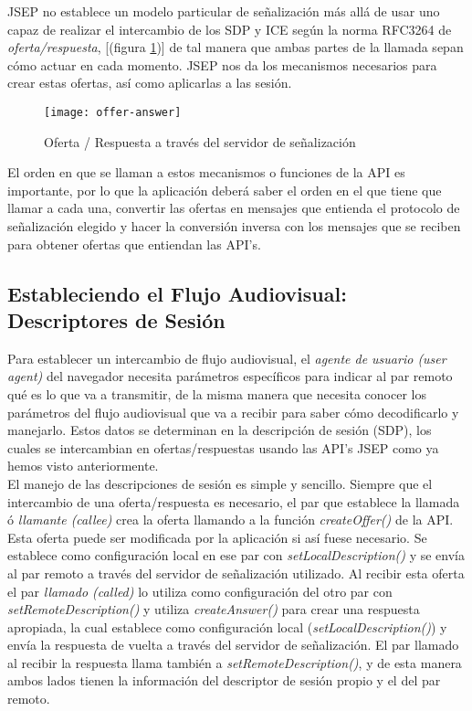 JSEP no establece un modelo particular de señalización más allá de usar uno capaz de realizar el intercambio de los SDP y ICE según la norma RFC3264 de \emph{oferta/respuesta}, [(figura \ref{fig:oferta-respuesta})] de tal manera que ambas partes de la llamada sepan cómo actuar en cada momento. JSEP nos da los mecanismos necesarios para crear estas ofertas, así como aplicarlas a las sesión.\\

\begin{figure}[h!]
\centering
\texttt{[image: offer-answer]}
\caption{Oferta / Respuesta a través del servidor de señalización}
\label{fig:oferta-respuesta}
\end{figure}


El orden en que se llaman a estos mecanismos o funciones de la API es importante, por lo que la aplicación deberá saber el orden en el que tiene que llamar a cada una, convertir las ofertas en mensajes que entienda el protocolo de señalización elegido y hacer la conversión inversa con los mensajes que se reciben para obtener ofertas que entiendan las API's.\\


\subsection{Estableciendo el Flujo Audiovisual: Descriptores de Sesión}

Para establecer un intercambio de flujo audiovisual, el \textit{agente de usuario (user agent)} del navegador necesita parámetros específicos para indicar al par remoto qué es lo que va a transmitir, de la misma manera que necesita conocer los parámetros del flujo audiovisual que va a recibir para saber cómo decodificarlo y manejarlo. Estos datos se determinan en la descripción de sesión (SDP), los cuales se intercambian en ofertas/respuestas usando las API's JSEP como ya hemos visto anteriormente.\\

El manejo de las descripciones de sesión es simple y sencillo. Siempre que el intercambio de una oferta/respuesta es necesario, el par que establece la llamada ó \textit{llamante (callee)} crea la oferta llamando a la función \emph{createOffer()} de la API. Esta oferta puede ser modificada por la aplicación si así fuese necesario. Se establece como configuración local en ese par con \emph{setLocalDescription()} y se envía al par remoto a través del servidor de señalización utilizado. Al recibir esta oferta el par \textit{llamado (called)} lo utiliza como configuración del otro par con \emph{setRemoteDescription()} y utiliza \emph{createAnswer()} para crear una respuesta apropiada, la cual establece como configuración local (\emph{setLocalDescription()}) y envía la respuesta de vuelta a través del servidor de señalización. El par llamado al recibir la respuesta llama también a \emph{setRemoteDescription()}, y de esta manera ambos lados tienen la información del descriptor de sesión propio y el del par remoto.\\ 



